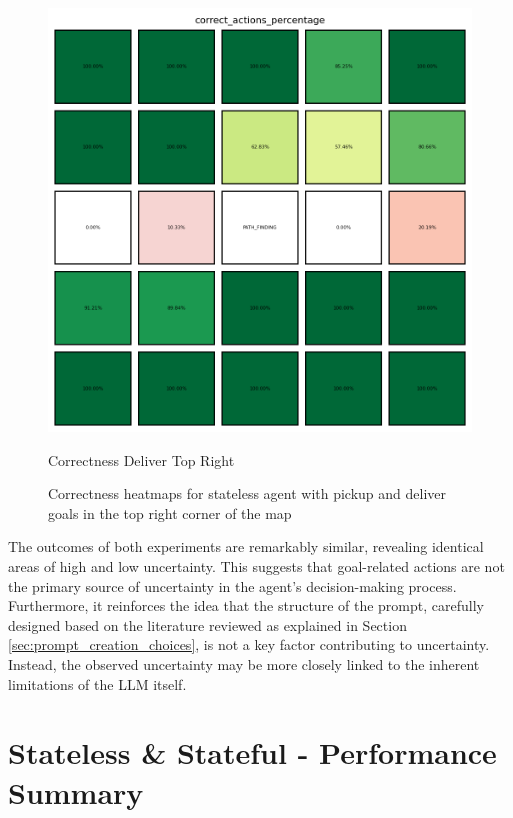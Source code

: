 \begin{figure}[h!]
\begin{minipage}[b]{0.45\textwidth}
    \includegraphics[width=\textwidth]{
      images/results_discussion/path_finding/correct_actions_percentage_PERC.png
    }
    \caption{Correctness Deliver Top Right}
    \label{fig:path_finding_corr}
  \end{minipage}
  \caption{Correctness heatmaps for stateless agent with pickup and deliver
  goals in the top right corner of the map}
  \label{fig:path_finding}
\end{figure}

The outcomes of both experiments are remarkably similar, revealing identical
areas of high and low uncertainty. This suggests that goal-related actions are not
the primary source of uncertainty in the agent's decision-making process.
Furthermore, it reinforces the idea that the structure of the prompt, carefully
designed based on the literature reviewed as explained in Section
\ref{sec:prompt_creation_choices}, is not a key factor contributing to uncertainty.
Instead, the observed uncertainty may be more closely linked to the inherent limitations
of the LLM itself.

\section{Stateless \& Stateful - Performance Summary}
\label{sec:stateless_and_stateful_combined_results}

